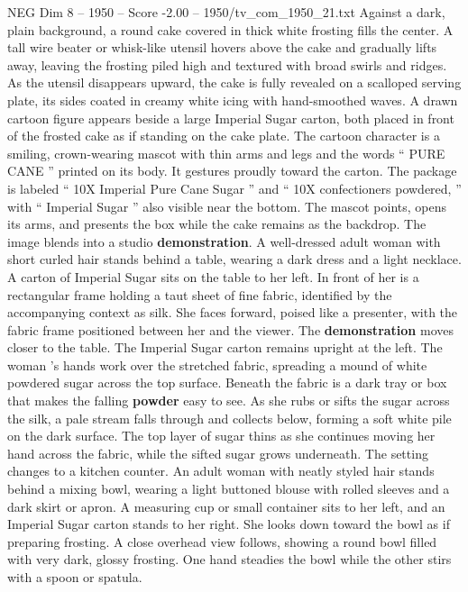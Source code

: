 \begin{textsample}{NEG Dim 8 – 1950 – Score -2.00 – 1950/tv\_com\_1950\_21.txt}  \label{ex:f8_neg_030}
Against a dark, plain background, a round cake covered in thick white frosting fills the center.
A tall wire beater or whisk-like utensil hovers above the cake and gradually lifts away, leaving the frosting piled high and textured with broad swirls and ridges.
As the utensil disappears upward, the cake is fully revealed on a scalloped serving plate, its sides coated in creamy white icing with hand-smoothed waves.
A drawn cartoon figure appears beside a large Imperial Sugar carton, both placed in front of the frosted cake as if standing on the cake plate.
The cartoon character is a smiling, crown-wearing mascot with thin arms and legs and the words “ PURE CANE ” printed on its body.
It gestures proudly toward the carton.
The package is labeled “ 10X Imperial Pure Cane Sugar ” and “ 10X confectioners powdered, ” with “ Imperial Sugar ” also visible near the bottom.
The mascot points, opens its arms, and presents the box while the cake remains as the backdrop.
The image blends into a studio \textbf{demonstration}.
A well-dressed adult woman with short curled hair stands behind a table, wearing a dark dress and a light necklace.
A carton of Imperial Sugar sits on the table to her left.
In front of her is a rectangular frame holding a taut sheet of fine fabric, identified by the accompanying context as silk.
She faces forward, poised like a presenter, with the fabric frame positioned between her and the viewer.
The \textbf{demonstration} moves closer to the table.
The Imperial Sugar carton remains upright at the left.
The woman ’s hands work over the stretched fabric, spreading a mound of white powdered sugar across the top surface.
Beneath the fabric is a dark tray or box that makes the falling \textbf{powder} easy to see.
As she rubs or sifts the sugar across the silk, a pale stream falls through and collects below, forming a soft white pile on the dark surface.
The top layer of sugar thins as she continues moving her hand across the fabric, while the sifted sugar grows underneath.
The setting changes to a kitchen counter.
An adult woman with neatly styled hair stands behind a mixing bowl, wearing a light buttoned blouse with rolled sleeves and a dark skirt or apron.
A measuring cup or small container sits to her left, and an Imperial Sugar carton stands to her right.
She looks down toward the bowl as if preparing frosting.
A close overhead view follows, showing a round bowl filled with very dark, glossy frosting.
One hand steadies the bowl while the other stirs with a spoon or spatula.

\end{textsample}
